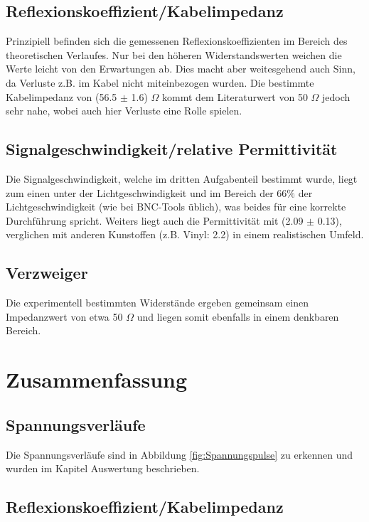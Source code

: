 \documentclass[12pt,a4paper,twoside]{article}
\begin{document}
\subsection{Reflexionskoeffizient/Kabelimpedanz}

Prinzipiell befinden sich die gemessenen Reflexionskoeffizienten im Bereich des theoretischen Verlaufes.
Nur bei den höheren Widerstandswerten weichen die Werte leicht von den Erwartungen ab.
Dies macht aber weitesgehend auch Sinn, da Verluste z.B. im Kabel nicht miteinbezogen wurden.
Die bestimmte Kabelimpedanz von (56.5 $\pm$ 1.6) $\Omega$ kommt dem Literaturwert von 50 $\Omega$ jedoch sehr nahe, wobei auch hier Verluste eine Rolle spielen.


\subsection{Signalgeschwindigkeit/relative Permittivität}

Die Signalgeschwindigkeit, welche im dritten Aufgabenteil bestimmt wurde, liegt zum einen unter der Lichtgeschwindigkeit und im Bereich der 66$\%$ der Lichtgeschwindigkeit (wie bei BNC-Tools üblich), was beides für eine korrekte Durchführung spricht.
Weiters liegt auch die Permittivität mit (2.09 $\pm$ 0.13), verglichen mit anderen Kunstoffen (z.B. Vinyl: 2.2) in einem realistischen Umfeld.


\subsection{Verzweiger}

Die experimentell bestimmten Widerstände ergeben gemeinsam einen Impedanzwert von etwa 50 $\Omega$ und liegen somit ebenfalls in einem denkbaren Bereich.


\section{Zusammenfassung} %

\subsection{Spannungsverläufe}

Die Spannungsverläufe sind in Abbildung \ref{fig:Spannungspulse} zu erkennen und wurden im Kapitel Auswertung beschrieben.


\subsection{Reflexionskoeffizient/Kabelimpedanz}
\end{document}
